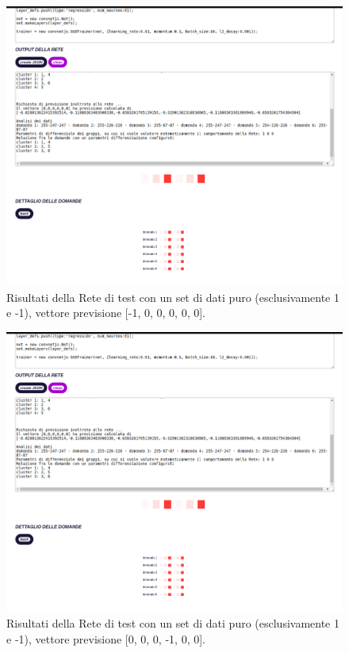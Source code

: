 \begin{figure}[H]
\centering
	\includegraphics[width=1\linewidth]{./image/RetediProva_generatorinputpuro.png}
	\caption{Risultati della Rete di test con un set di dati puro (esclusivamente 1 e -1), vettore previsione [-1, 0, 0, 0, 0, 0].}
	\label{Risultati della Rete di test con un set di dati puro (esclusivamente 1 e -1), vettore previsione [-1, 0, 0, 0, 0, 0].}
\end{figure}
\noindent

\begin{figure}[H]
\centering
	\includegraphics[width=1\linewidth]{./image/RetediProva_generatorinputpuro.png}
	\caption{Risultati della Rete di test con un set di dati puro (esclusivamente 1 e -1), vettore previsione [0, 0, 0, -1, 0, 0].}
	\label{Risultati della Rete di test con un set di dati puro (esclusivamente 1 e -1), vettore previsione [0, 0, 0, -1, 0, 0].}
\end{figure}
\noindent

